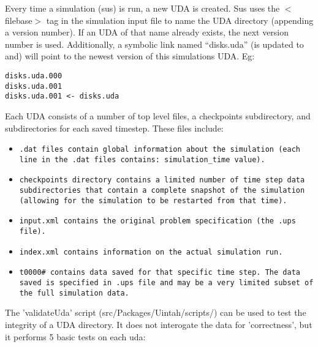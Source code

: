 
Every time a simulation (sus) is run, a new UDA is created.  Sus uses
the $<$filebase$>$ tag in the simulation input file to name the UDA
directory (appending a version number).  If an UDA of that name
already exists, the next version number is used.  Additionally, a
symbolic link named ``disks.uda'' (is updated to and) will point to
the newest version of this simulations UDA.  Eg:

\begin{Verbatim}[fontsize=\footnotesize]
disks.uda.000
disks.uda.001
disks.uda.001 <- disks.uda
\end{Verbatim}


Each UDA consists of a number of top level files, a checkpoints
subdirectory, and subdirectories for each saved timestep.  These files
include:

\begin{itemize}

\item \tt.dat \normalfont files contain global information about the
  simulation (each line in the .dat files contains: simulation\_time
  value).
\item \tt checkpoints \normalfont directory contains a limited
  number of time step data subdirectories that contain a complete
  snapshot of the simulation (allowing for the simulation to be
  restarted from that time).
\item \tt input.xml \normalfont contains the original problem
  specification (the .ups file).
\item \tt index.xml \normalfont contains information on the actual
  simulation run.
\item \tt t0000\# \normalfont contains data saved for that specific
  time step.  The data saved is specified in .ups file and may be a
  very limited subset of the full simulation data.

\end{itemize}

The 'validateUda' script (src/Packages/Uintah/scripts/) can be used to
test the integrity of a UDA directory. It does not interogate the data
for 'correctness', but it performs 5 basic tests on each uda:

